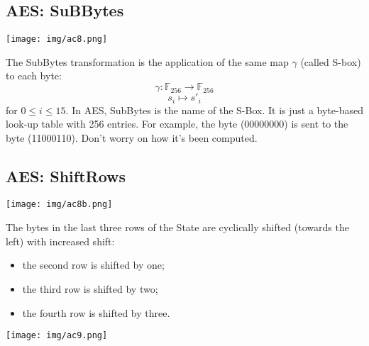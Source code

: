 \documentclass[a4paper, 10pt, titlepage]{article}
\begin{document}
\subsection{AES: SuBBytes}
\begin{minipage}{0.3\textwidth}
\texttt{[image: img/ac8.png]}
\end{minipage}
\hfill
\begin{minipage}{0.6\textwidth}
The SubBytes transformation is the application of the same map $\gamma$ (called S-box) to each byte:
$$\gamma: \mathbb{F}_{256} \rightarrow \mathbb{F}_{256}$$
$$s_i \mapsto s'_i$$
for $0 \leq i \leq 15$.
In AES, SubBytes is the name of the S-Box. It is just a byte-based look-up table with 256 entries. For example, the byte (00000000) is sent to the byte (11000110). Don't worry on how it's been computed.
\end{minipage}

\subsection{AES: ShiftRows}
\begin{minipage}{0.3\textwidth}
\texttt{[image: img/ac8b.png]}
\end{minipage}
\begin{minipage}{0.6\textwidth}
The bytes in the last three rows of the State are cyclically shifted (towards the left) with increased shift:
\begin{itemize}
\item the second row is shifted by one;
\item the third row is shifted by two;
\item the fourth row is shifted by three.
\end{itemize}
\texttt{[image: img/ac9.png]}
\end{minipage}
\end{document}
